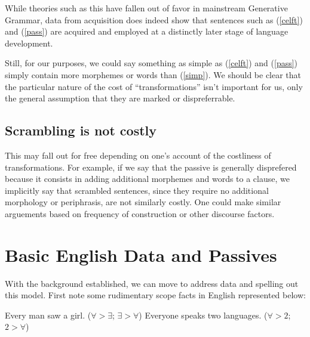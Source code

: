 \documentclass{article}
\begin{document}
While theories such as this have fallen out of favor in mainstream Generative Grammar, data from acquisition does indeed show that sentences such as (\ref{celft}) and (\ref{pass}) are acquired and employed at a distinctly later stage of language development.

Still, for our purposes, we could say something as simple as (\ref{celft}) and (\ref{pass}) simply contain more morphemes or words than (\ref{simp}).
We should be clear that the particular nature of the cost of ``transformations'' isn't important for us, only the general assumption that they are marked or dispreferrable.


\subsection{Scrambling is not costly\label{scrambcost}}

This may fall out for free depending on one's account of the costliness of transformations.
For example, if we say that the passive is generally disprefered because it consists in adding additional morphemes and words to a clause, we implicitly say that scrambled sentences, since they require no additional morphology or periphrasis, are not similarly costly.
One could make similar arguements based on frequency of construction or other discourse factors.

\section{Basic English Data and Passives\label{eng}}

With the background established, we can move to address data and spelling out this model.
First note some rudimentary scope facts in English represented below:

\begin{exe}
\ex\label{first}{\begin{xlist}
\ex Every man saw a girl. \hfill ($\forall > \exists$; $\exists >  \forall$)\label{evman}
\ex Everyone speaks two languages. \hfill ($\forall > 2$; $2 > \forall$)\label{evsp}
\end{xlist}}
\end{exe}
\end{document}
